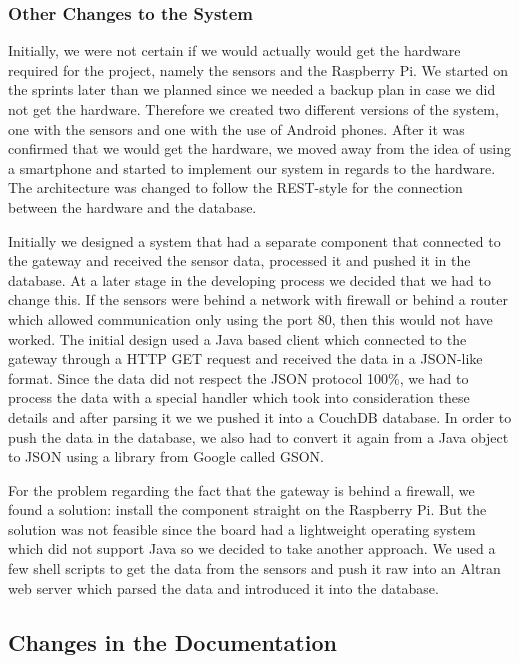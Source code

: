 \documentclass[../document.tex]{subfiles}
\begin{document}
\subsubsection{Other Changes to the System}
Initially, we were not certain if we would actually would get the hardware required for the project, namely the sensors and the \gls{Raspberry Pi}. We started on the sprints later than we planned since we needed a backup plan in case we did not get the hardware. Therefore we created two different versions of the system, one with the sensors and one with the use of \gls{Android} phones. After it was confirmed that we would get the hardware, we moved away from the idea of using a smartphone and started to implement our system in regards to the hardware. The architecture was changed to follow the \gls{REST}-style for the connection between the hardware and the database. 

Initially we designed a system that had a separate component that connected to the gateway and received the sensor data, processed it and pushed it in the database. At a later stage in the developing process we decided that we had to change this. If the sensors were behind a network with firewall or behind a router which allowed communication only using the port 80, then this would not have worked. The initial design used a \gls{Java} based client which connected to the gateway through a \gls{HTTP} GET request and received the data in a \gls{JSON}-like format. Since the data did not respect the \gls{JSON} protocol 100\%, we had to process the data with a special handler which took into consideration these details and after parsing it we we pushed it into a CouchDB database. In order to push the data in the database, we also had to convert it again from a \gls{Java} object to \gls{JSON} using a library from Google called GSON. 

For the problem regarding the fact that the gateway is behind a firewall, we found a solution: install the component straight on the \gls{Raspberry Pi}. But the solution was not feasible since the board had a lightweight operating system which did not support \gls{Java} so we decided to take another approach. We used a few shell scripts to get the data from the sensors and push it raw into an \gls{Altran} web server which parsed the data and introduced it into the database.

\subsection{Changes in the Documentation}
\end{document}
